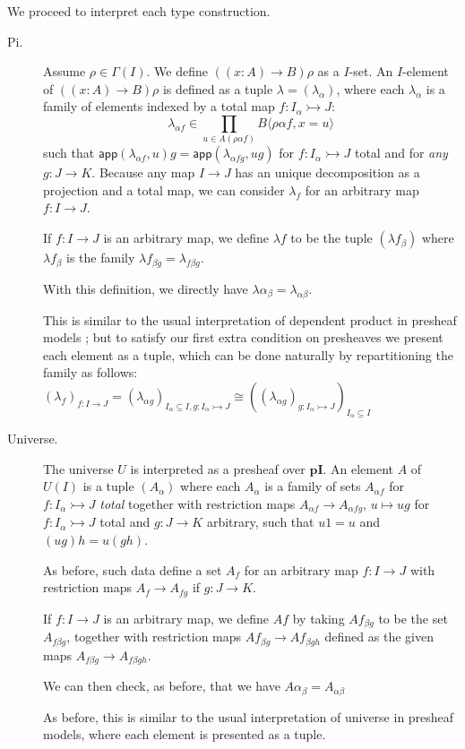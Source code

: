 \documentclass[english]{PaperTools/latex/lipics}
\def\pI{\ensuremath{\mathbf{pI}}}
\def\app#1#2{\mathsf{app}(#1,#2)}
\begin{document}
\bigskip
We proceed to interpret each type construction.
\begin{description}
  \item[\sc Pi.]
    Assume $ρ ∈ Γ(I)$. We define $((x:A) → B)ρ$ as a $I$-set.
    An $I$-element of $((x:A) → B)ρ$ is defined as a tuple $λ = (λ_α)$,
    where each $λ_α$ is a family of elements indexed by a total map $f : I_α ↣ J$:
    $$λ_{α f} ∈ \prod_{u ∈ A(ραf)} B⟨ραf,x=u⟩$$
    such that
    $\app{λ_{αf}}{u} g = \app{λ_{α fg}}{ug}$ for $f : I_α ↣ J$ total and
    for \emph{any} $g : J → K$.
    Because any map $I → J$ has an unique decomposition as a projection and a total
    map, we can consider $λ_f$ for an arbitrary map $f : I → J$.

    If $f : I → J$ is an arbitrary map, we define $λ f$ to be the tuple
    $(λf_β)$ where $λf_β$ is the family $λf_{βg} = λ_{fβg}$.

    With this definition, we directly have $λα_{β} = λ_{αβ}$.

    This is similar to the usual interpretation of dependent product in
    presheaf models \citep{Hofmann97syntaxand,bezem2014model}; but to
    satisfy our first extra condition on presheaves we present
    each element as a tuple, which can be done naturally by repartitioning
    the family as follows:
    $(λ_f)_{f : I → J} = (λ_{αg})_{I_α ⊆ I, g : I_α ↣ J} ≅
     ((λ_{αg})_{g : I_α ↣ J})_{I_α ⊆ I}$


  \item[\sc Universe.]
    The universe $U$ is interpreted as a presheaf over \pI. An element $A$ of
    $U(I)$ is a tuple $(A_α)$ where each $A_α$ is a family of sets
    $A_{α f}$ for $f : I_α ↣ J$ \emph{total} together with restriction
    maps $A_{α f} → A_{α fg}$, $u ↦ ug$ for $f : I_α ↣ J$ total
    and $g : J → K$ arbitrary, such that $u1 = u$ and $(ug)h = u(gh)$.

    As before, such data define a set $A_f$ for an arbitrary map $f : I → J$
    with restriction maps $A_f → A_{fg}$ if $g : J → K$.

    If $f : I → J$ is an arbitrary map, we define $Af$ by taking $Af_{βg}$
    to be the set $A_{fβg}$, together with restriction maps $Af_{βg} → Af_{βgh}$
    defined as the given maps $A_{fβg} → A_{fβgh}$.

    We can then check, as before, that we have $Aα_{β} = A_{αβ}$

    As before, this is similar to the usual interpretation of universe in
    presheaf models, where each element is presented as a tuple.



\end{description}
\end{document}
